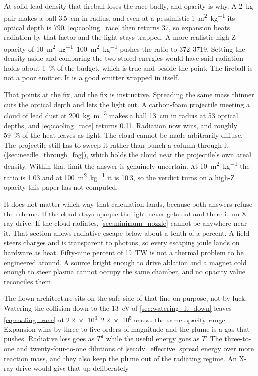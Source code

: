\documentclass{article}
\begin{document}
At solid lead density that fireball loses the race badly, and opacity is why. A \SI{2}{\kilo\gram} pair makes a ball \SI{3.5}{\centi\meter} in radius, and even at a pessimistic \SI{1}{\square\meter\per\kilogram} its optical depth is \num{790}. \autoref{eq:cooling_race} then returns \num{37}, so expansion beats radiation by that factor and the light stays trapped. A more realistic high-Z opacity of \SIrange{10}{100}{\square\meter\per\kilogram} pushes the ratio to \numrange[range-phrase={--}]{372}{3719}. Setting the density aside and comparing the two stored energies would have said radiation holds about \SI{1}{\percent} of the budget, which is true and beside the point. The fireball is not a poor emitter. It is a good emitter wrapped in itself.

That points at the fix, and the fix is instructive. Spreading the same mass thinner cuts the optical depth and lets the light out. A carbon-foam projectile meeting a cloud of lead dust at \SI{200}{\kilogram\per\cubic\meter} makes a ball \SI{13}{\centi\meter} in radius at \num{53} optical depths, and \autoref{eq:cooling_race} returns \num{0.11}. Radiation now wins, and roughly \SI{59}{\percent} of the heat leaves as light. The cloud cannot be made arbitrarily diffuse. The projectile still has to sweep it rather than punch a column through it (\autoref{sec:needle_through_fog}), which holds the cloud near the projectile's own areal density. Within that limit the answer is genuinely uncertain. At \SI{10}{\square\meter\per\kilogram} the ratio is \num{1.03} and at \SI{100}{\square\meter\per\kilogram} it is \num{10.3}, so the verdict turns on a high-Z opacity this paper has not computed.

It does not matter which way that calculation lands, because both answers refuse the scheme. If the cloud stays opaque the light never gets out and there is no X-ray drive. If the cloud radiates, \autoref{sec:minimum_nozzle} cannot be anywhere near it. That section allows radiative escape below about a tenth of a percent. A field steers charges and is transparent to photons, so every escaping joule lands on hardware as heat. Fifty-nine percent of \SI{10}{\tera\watt} is not a thermal problem to be engineered around. A source bright enough to drive ablation and a magnet cold enough to steer plasma cannot occupy the same chamber, and no opacity value reconciles them.

The flown architecture sits on the safe side of that line on purpose, not by luck. Watering the collision down to the \SI{13}{\electronvolt} of \autoref{sec:watering_it_down} leaves \autoref{eq:cooling_race} at \numrange{2.2e3}{2.2e5} across the same opacity range. Expansion wins by three to five orders of magnitude and the plume is a gas that pushes. Radiative loss goes as $T^4$ while the useful energy goes as $T$. The three-to-one and twenty-four-to-one dilutions of \autoref{sec:dv_effective} spread energy over more reaction mass, and they also keep the plume out of the radiating regime. An X-ray drive would give that up deliberately.
\end{document}

